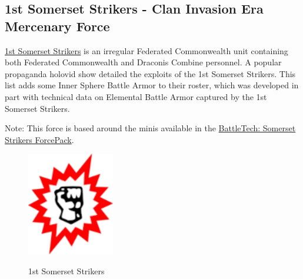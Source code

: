 \subsection{1st Somerset Strikers - Clan Invasion Era Mercenary Force}

\href{https://www.sarna.net/wiki/1st_Somerset_Strikers}{1st Somerset Strikers} is an irregular Federated Commonwealth unit containing both Federated Commonwealth and Draconis Combine personnel.
A popular propaganda holovid show detailed the exploits of the 1st Somerset Strikers.
This list adds some Inner Sphere Battle Armor to their roster, which was developed in part with technical data on Elemental Battle Armor captured by the 1st Somerset Strikers.

Note: This force is based around the minis available in the \href{https://www.sarna.net/wiki/BattleTech:_Somerset_Strikers_ForcePack}{BattleTech: Somerset Strikers ForcePack}.

\begin{figure}[!h]
  \centering
  \includegraphics[alt='1st Somerset Strikers Logo', width=1.5in, height=1.778in]{img/1st-Somerset-Strikers.png}
  \caption*{1st Somerset Strikers}
\end{figure}

